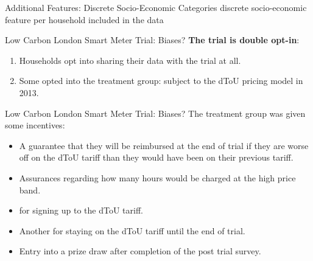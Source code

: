 \documentclass{beamer}
\begin{document}
\begin{frame}{Additional Features: Discrete Socio-Economic Categories}
  discrete socio-economic feature per household included in the data
\end{frame}


\begin{frame}{Low Carbon London Smart Meter Trial: Biases?}
  \textbf{The trial is double opt-in}:
  \begin{enumerate}
    \item<+-> Households opt into sharing their data with the trial at all.
    \item<+-> Some opted into the treatment group: subject to the dToU pricing model in 2013.
  \end{enumerate}
\end{frame}

\begin{frame}{Low Carbon London Smart Meter Trial: Biases?}
  The treatment group was given some incentives: 
  \begin{itemize}
    \item A guarantee that they will be reimbursed at the end of trial if they are worse off on the dToU tariff than they would have been on their previous tariff.
    \item Assurances regarding how many hours would be charged at the high price band.
    \item {} for signing up to the dToU tariff.
    \item Another  for staying on the dToU tariff until the end of trial.
    \item Entry into a prize draw after completion of the post trial survey.
  \end{itemize}
\end{frame}
\end{document}
